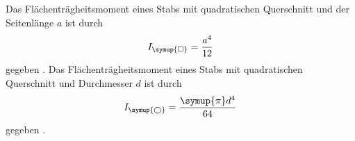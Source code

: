 Das Flächenträgheitsmoment eines Stabs mit quadratischen Querschnitt und der Seitenlänge $a$ ist durch
\begin{align}
    \label{eqn:quadrat}
    I_{\symup{\square}} = \frac{a^4}{12}
\end{align}
gegeben \cite{flaechentreagheitsmomente}. Das Flächenträgheitsmoment eines Stabs mit quadratischen Querschnitt und Durchmesser $d$ ist durch
\begin{align}
    \label{eqn:kreis}
    I_{\symup{\bigcirc}} = \frac{\symup{\pi}d^4}{64}
\end{align}
gegeben \cite{flaechentreagheitsmomente}.
